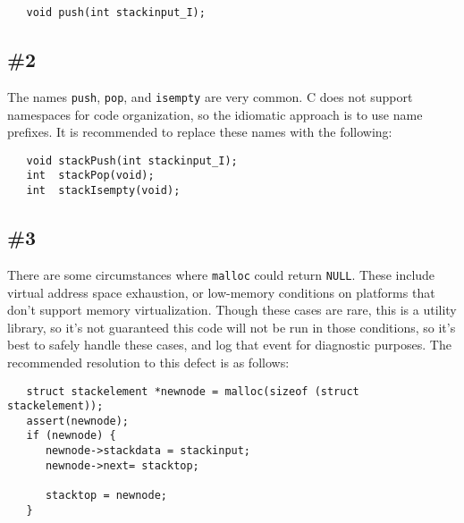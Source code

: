 \documentclass[11pt]{article}
\begin{document}
\begin{verbatim}
   void push(int stackinput_I);
\end{verbatim}

\subsection{\#2}
The names \texttt{push}, \texttt{pop}, and \texttt{isempty} are very common.  C does not support
namespaces for code organization, so the idiomatic approach is to use name prefixes.  It is
recommended to replace these names with the following:

\begin{verbatim}
   void stackPush(int stackinput_I);
   int  stackPop(void);
   int  stackIsempty(void);
\end{verbatim}

\subsection{\#3}
There are some circumstances where \texttt{malloc} could return \texttt{NULL}.  These include
virtual address space exhaustion, or low-memory conditions on platforms that don't support memory
virtualization.  Though these cases are rare, this is a utility library, so it's not guaranteed this
code will not be run in those conditions, so it's best to safely handle these cases, and log that
event for diagnostic purposes.  The recommended resolution to this defect is as follows:

\begin{verbatim}
   struct stackelement *newnode = malloc(sizeof (struct stackelement));
   assert(newnode);
   if (newnode) {
      newnode->stackdata = stackinput;
      newnode->next= stacktop;
      
      stacktop = newnode;
   }
\end{verbatim}
\end{document}
